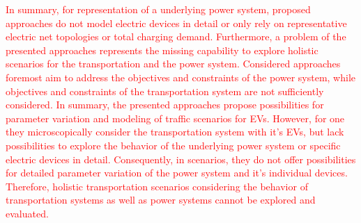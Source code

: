 \textcolor{red}{
In summary, for representation of a underlying power system, proposed approaches do not model electric devices in detail or only rely on representative electric net topologies or total charging demand. Furthermore, a problem of the presented approaches represents the missing capability to explore holistic scenarios for the transportation and the power system. Considered approaches foremost aim to address the objectives and constraints of the power system, while objectives and constraints of the transportation system are not sufficiently considered. In summary, the presented approaches propose possibilities for parameter variation and modeling of traffic scenarios for EVs. However, for one they microscopically consider the transportation system with it's EVs, but lack possibilities to explore the behavior of the underlying power system or specific electric devices in detail. Consequently, in scenarios, they do not offer possibilities for detailed parameter variation of the power system and it's individual devices. Therefore, holistic transportation scenarios considering the behavior of transportation systems as well as power systems cannot be explored and evaluated.
}